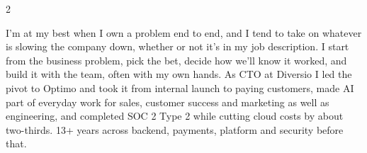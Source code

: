 \documentclass[10pt,a4paper,withhyper,ragged2e]{altacv}
\begin{document}
\begin{paracol}{2}

%
%

I'm at my best when I own a problem end to end, and I tend to take on whatever is slowing the company down, whether or not it's in my job description. I start from the business problem, pick the bet, decide how we'll know it worked, and build it with the team, often with my own hands. As CTO at Diversio I led the pivot to Optimo and took it from internal launch to paying customers, made AI part of everyday work for sales, customer success and marketing as well as engineering, and completed SOC 2 Type 2 while cutting cloud costs by about two-thirds. 13+ years across backend, payments, platform and security before that.



\end{paracol}
\end{document}
